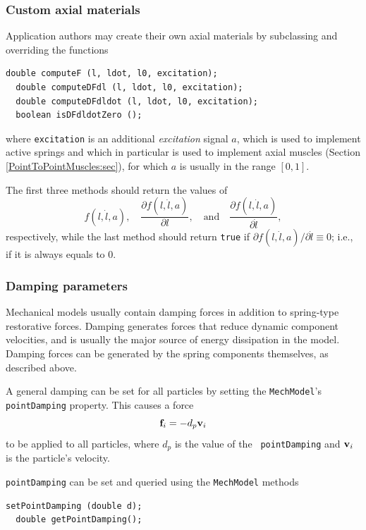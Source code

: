 \subsubsection{Custom axial materials}

Application authors may create their
own axial materials by subclassing 
and overriding the functions
%
\begin{lstlisting}[]
  double computeF (l, ldot, l0, excitation);
  double computeDFdl (l, ldot, l0, excitation);
  double computeDFdldot (l, ldot, l0, excitation);
  boolean isDFdldotZero ();
\end{lstlisting}
%
where {\tt excitation} is an additional {\it excitation} signal $a$, which
is used to implement active springs and which in particular is used to
implement axial muscles (Section \ref{PointToPointMuscles:sec}), for
which $a$ is usually in the range $[0, 1]$.

The first three methods should return the values of 
%
\begin{equation}
f (l, \dot l, a), \quad
\frac{\partial f(l, \dot l, a)}{\partial l}, \quad \text{and} \quad
\frac{\partial f(l, \dot l, a)}{\partial \dot l},
\end{equation}
%
respectively, while the last method should return {\tt true} if
$\partial f(l, \dot l, a) / \partial \dot l \equiv 0$; i.e., if it is
always equals to 0.

\subsubsection{Damping parameters}

Mechanical models usually contain damping forces in addition to
spring-type restorative forces. Damping generates forces that reduce
dynamic component velocities, and is usually the major source of
energy dissipation in the model. Damping forces can be generated by
the spring components themselves, as described above.

A general damping can be set for all particles by setting the
{\tt MechModel}'s {\tt pointDamping} property. This causes
a force
%
\begin{equation}
{\bf f}_i = -d_p {\bf v}_i \label{eqn:pointdamping}
\end{equation}
%
to be applied to all particles, where $d_p$ is the value of the {\tt
pointDamping} and ${\bf v}_i$ is the particle's velocity.

{\tt pointDamping} can be set and queried using the {\tt MechModel}
methods
%
\begin{lstlisting}[]
  setPointDamping (double d);
  double getPointDamping();
\end{lstlisting}
%

